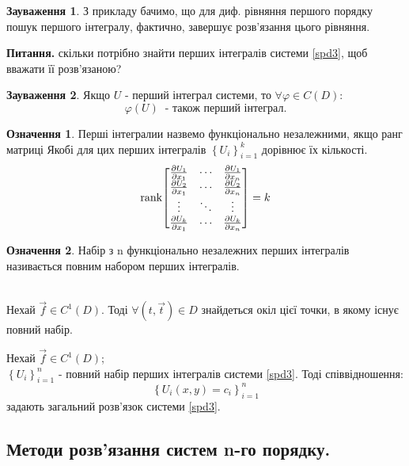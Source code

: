 \documentclass[14pt,a4paper]{scrartcl}
\theoremstyle{definition}
\newtheorem*{defo}{Означення}
\newtheorem*{remark}{Зауваження}
\theoremstyle{definition}
\theoremstyle{definition}
\begin{document}
\begin{remark}
    З прикладу бачимо, що для диф. рівняння першого порядку пошук першого інтегралу, фактично, завершує розв'язання цього рівняння.
\end{remark}
\textbf{Питання.} скільки потрібно знайти перших інтегралів системи  \eqref{spd3}, щоб вважати її розв'язаною?
\begin{remark}
    Якщо $U$ - перший інтеграл системи, то $\forall \varphi \in C(D)$:
    $$
    \varphi(U) \ \text{ - також перший інтеграл.}
    $$
\end{remark}
\def\rank{\text{rank}}
\begin{defo}
  Перші інтегралии назвемо функціонально незалежними, якщо ранг матриці Якобі для цих перших інтегралів $ \left\lbrace U_i \right\rbrace_{i=1}^{k}$ дорівнює їх кількості.
  $$
  \rank{\begin{bmatrix}
   \frac{\d U_1}{\d x_1} & \cdots & \frac{\d U_1}{\d x_n} \\
   \frac{\d U_2}{\d x_1} & \cdots & \frac{\d U_2}{\d x_n} \\
   \vdots & \ddots & \vdots\\
   \frac{\d U_k}{\d x_1} & \cdots & \frac{\d U_k}{\d x_n}
  \end{bmatrix}} = k
  $$
\end{defo}
\begin{defo}
 Набір з n функціонально незалежних перших інтегралів називається повним набором перших інтегралів.
\end{defo}
\begin{boxteo} \ \\
Нехай $\overrightarrow{f} \in C^1(D)$. Тоді $\forall (t, \overrightarrow{t}) \in D$ знайдеться окіл цієї точки, в якому існує повний набір.
\end{boxteo}
\begin{boxteo}

  Нехай $\overrightarrow{f} \in C^1(D)$;  \ \\ $\left\lbrace U_i \right\rbrace_{i=1}^n$ - повний набір перших інтегралів системи \eqref{spd3}. Тоді співвідношення:
  $$
\left\lbrace U_i (x,y)  = c_i \right\rbrace^n_{i=1}
  $$
  задають загальний розв'язок системи \eqref{spd3}.
\end{boxteo}
\subsection{Методи розв'язання систем n-го порядку.}
\end{document}
